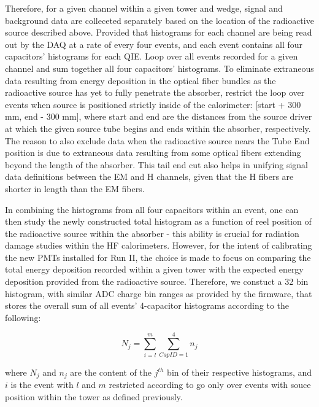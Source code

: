 Therefore, for a given channel within a given tower and wedge, signal and background data are colleceted separately based on the location of the
radioactive source described above. Provided that histograms for each channel
are being read out by the DAQ at a rate of every four events, and each event
contains all four capacitors' histograms for each QIE. Loop over all
events recorded for a given channel and sum together all four capacitors'
histograms. To eliminate extraneous data resulting from energy deposition
in the optical fiber bundles as the radioactive source has yet to fully
penetrate the absorber, restrict the loop over events when source is positioned strictly inside of the calorimeter: [start + 300 mm, end - 300 mm],
where start and end are the distances from the source driver at
which the given source tube begins and ends within the absorber, respectively.
The reason to also exclude data when the radioactive source nears the Tube End
position is due to extraneous data resulting from some optical fibers extending
beyond the length of the absorber. This tail end cut also helps in unifying
signal data definitions between the EM and H channels, given that the H fibers
are shorter in length than the EM fibers.

In combining the histograms from all four capacitors within an event, one can
then study the newly constructed total histogram as a function of reel position
of the radioactive source within the absorber - this ability is crucial for
radiation damage studies within the HF calorimeters. However, for the intent of
calibrating the new PMTs installed for Run II, the choice is made to focus on comparing the total energy deposition recorded within a given tower with the expected energy deposition provided from the radioactive source. Therefore, we constuct a 32 bin histogram, with similar ADC charge bin ranges as provided by the firmware, that stores the overall sum of all events' 4-capacitor histograms according to the following:
\begin{center}
   \begin{equation}
      \label{eq:Histo_Sum}
      N_j = \sum\limits_{i=l}^m \sum\limits_{CapID=1}^4 n_j
   \end{equation}
\end{center}

where $N_j$ and $n_j$ are the content of the $j^{th}$ bin of their respective
histograms, and $i$ is the event with $l$ and $m$ restricted according to
go only over events with souce position within the tower as defined previously.

